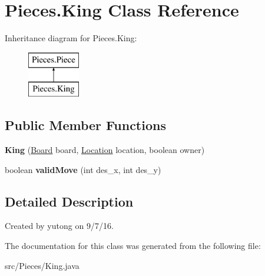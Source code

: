 \hypertarget{classMain_1_1King}{\section{Pieces.\-King Class Reference}
\label{classMain_1_1King}
}
Inheritance diagram for Pieces.\-King\-:\begin{figure}[H]
\begin{center}
\leavevmode
\includegraphics[height=2.000000cm]{classMain_1_1King}
\end{center}
\end{figure}
\subsection*{Public Member Functions}
\begin{DoxyCompactItemize}
\item 
\hypertarget{classMain_1_1King_acfc71bd997f78baafe2a5bfc2670d061}{{\bfseries King} (\hyperlink{classMain_1_1Board}{Board} board, \hyperlink{classMain_1_1Location}{Location} location, boolean owner)}\label{classMain_1_1King_acfc71bd997f78baafe2a5bfc2670d061}

\item 
\hypertarget{classMain_1_1King_aa040b1c8d29b25aa5a65bca5021a3df5}{boolean {\bfseries valid\-Move} (int des\-\_\-x, int des\-\_\-y)}\label{classMain_1_1King_aa040b1c8d29b25aa5a65bca5021a3df5}

\end{DoxyCompactItemize}


\subsection{Detailed Description}
Created by yutong on 9/7/16. 

The documentation for this class was generated from the following file\-:\begin{DoxyCompactItemize}
\item 
src/\-Pieces/King.\-java\end{DoxyCompactItemize}
